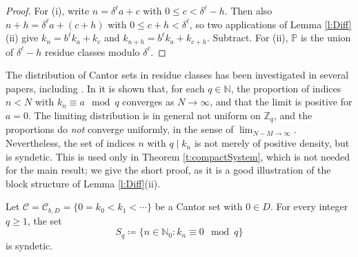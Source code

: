 \begin{proof}
For (i), write $n = \delta ^{\ell}a +c$ with $0 \leq c < \delta ^{\ell}-h$.  Then also $n+h = \delta ^{\ell}a + (c+h)$ with $0\leq c+h< \delta ^{\ell}$, 
so two applications of Lemma \ref{l:Diff}(ii) give $k_n = b ^{\ell}k_a + k_c$ and $k _{n+h} = b ^{\ell}k_a + k _{c+h}$.  Subtract.  
For (ii), $\mathbb P$ is the union of $\delta ^{\ell}-h$ residue classes modulo $\delta ^{\ell}$.  
\end{proof}


 

The distribution of Cantor sets in residue classes has been investigated in several papers, including \cites{ERDOS199899, SAAVEDRA-ARAYA_2026}.  
In \cite{firstpaper} it is shown that, for each $q \in \mathbb N$, the proportion of indices $n < N$ with $k_n \equiv a \mod q$ converges as $N \to \infty$, 
and that the limit is positive for $a = 0$.  The limiting distribution is in general not uniform on $\mathbb Z_q$, 
and the proportions do \emph{not} converge uniformly, in the sense of $\lim_{N-M\to\infty}$.  
Nevertheless, the set of indices $n$ with $q \mid k_n$ is not merely of positive density, but is syndetic.  
This is used only in Theorem \ref{t:compactSystem}, which is not needed for the main result; 
we give the short proof, as it is a good illustration of the block structure of Lemma \ref{l:Diff}(ii).  

\begin{lemma} \label{l:syndeticResidues}
Let $\mathcal C = \mathcal C_{b,D} = \{0=k_0<k_1 < \cdots\}$ be a Cantor set with $0 \in D$.  
For every integer $q \geq 1$, the set 
\begin{equation}
S_q \coloneqq \{ n \in \mathbb N_0 \colon k_n \equiv 0 \mod q \} 
\end{equation}
is syndetic.  
\end{lemma}

